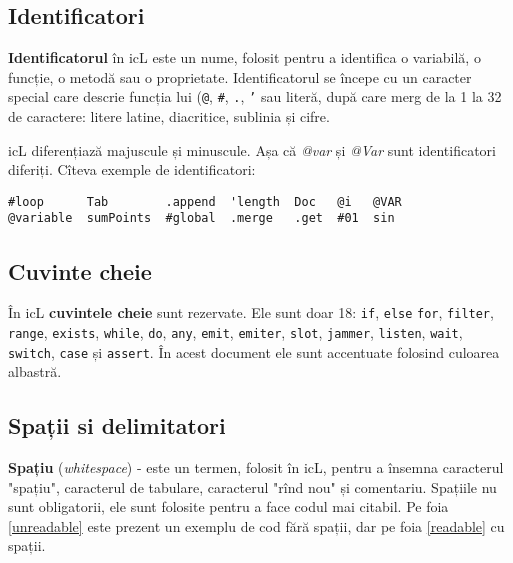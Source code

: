 \subsection{Identificatori}

\textbf{Identificatorul} în icL este un nume, folosit pentru a identifica o variabilă, o funcție, o metodă sau o proprietate. Identificatorul se începe cu un caracter special care descrie funcția lui (\texttt{@}, \texttt{#}, \texttt{.}, \texttt{'} sau literă, după care merg de la 1 la 32 de caractere: litere latine, diacritice, sublinia și cifre.

icL diferențiază majuscule și minuscule. Așa că \textit{@var} și \textit{@Var} sunt identificatori diferiți. Cîteva exemple de identificatori:

\begin{verbatim}
#loop      Tab        .append  'length  Doc   @i   @VAR
@variable  sumPoints  #global  .merge   .get  #01  sin
\end{verbatim}

\subsection{Cuvinte cheie}

În icL \textbf{cuvintele cheie} sunt rezervate. Ele sunt doar 18: \texttt{if}, \texttt{else} \texttt{for}, \texttt{filter}, \texttt{range}, \texttt{exists}, \texttt{while}, \texttt{do}, \texttt{any}, \texttt{emit}, \texttt{emiter}, \texttt{slot}, \texttt{jammer}, \texttt{listen}, \texttt{wait}, \texttt{switch}, \texttt{case} și \texttt{assert}. În acest document ele sunt accentuate folosind culoarea albastră.

\subsection{Spații si delimitatori}

\textbf{Spațiu} (\textit{whitespace}) - este un termen, folosit în icL, pentru a însemna caracterul "spațiu", caracterul de tabulare, caracterul "rînd nou" și comentariu. Spațiile nu sunt obligatorii, ele sunt folosite pentru a face codul mai citabil. Pe foia \ref{unreadable} este prezent un exemplu de cod fără spații, dar pe foia \ref{readable} cu spații.

\begin{sourcecode}
    \label{unreadable}
    \inputminted[linenos]{icl}{../sources/unreadable.icL}
\end{sourcecode}

